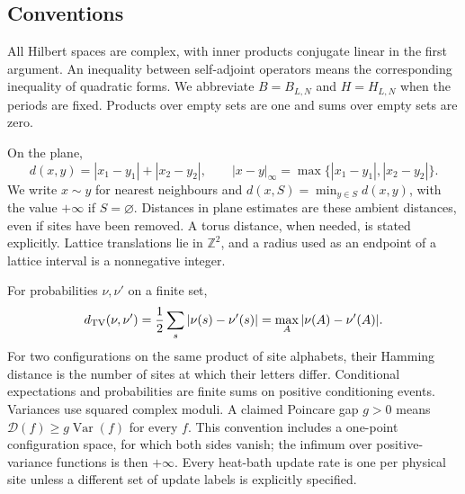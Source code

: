 \subsection{Conventions}

All Hilbert spaces are complex, with inner products conjugate linear
in the first argument. An inequality between self-adjoint operators
means the corresponding inequality of quadratic forms.
We abbreviate \(B=B_{L,N}\) and \(H=H_{L,N}\) when the periods are
fixed. Products over empty sets are one and sums over empty sets
are zero.

On the plane,
\[
 d(x,y)=|x_1-y_1|+|x_2-y_2|,\qquad
 |x-y|_\infty=\max\{|x_1-y_1|,|x_2-y_2|\}.
\]
We write \(x\sim y\) for nearest neighbours and
\(d(x,S)=\min_{y\in S}d(x,y)\), with the value \(+\infty\) if
\(S=\varnothing\). Distances in plane estimates are these ambient
distances, even if sites have been removed. A torus distance, when
needed, is stated explicitly.
Lattice translations lie in \(\mathbb Z^2\), and a radius used as
an endpoint of a lattice interval is a nonnegative integer.

For probabilities \(\nu,\nu'\) on a finite set,
\[
 d_{\rm TV}(\nu,\nu')
 =\frac12\sum_s|\nu(s)-\nu'(s)|
 =\max_A|\nu(A)-\nu'(A)|.
\]
For two configurations on the same product of site alphabets, their
Hamming distance is the number of sites at which their letters
differ. Conditional expectations and probabilities are finite sums
on positive conditioning events. Variances use squared complex
moduli. A claimed Poincare gap \(g>0\) means
\(\mathcal D(f)\ge g\operatorname{Var}(f)\) for every \(f\).
This convention includes a one-point configuration space, for which
both sides vanish; the infimum over positive-variance functions is
then \(+\infty\). Every heat-bath update rate is one per physical
site unless a different set of update labels is explicitly specified.
